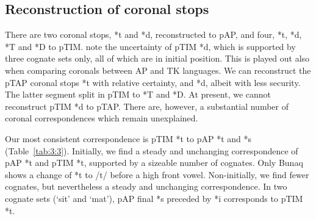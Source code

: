 \subsection{Reconstruction of coronal stops}
There are two coronal stops, *t and *d, reconstructed to pAP, and four, *t, *d, *T and *D to pTIM. \citet{SchapperEtAl2012} note the uncertainty of pTIM *d, which is supported by three cognate sets only, all of which are in initial position. This is played out also when comparing coronals between AP and TK languages. We can reconstruct the pTAP coronal stops *t with relative certainty, and *d, albeit with less security. The latter segment split in pTIM to *T and *D. At present, we cannot reconstruct pTIM *d to pTAP. There are, however, a substantial number of coronal correspondences which remain unexplained. 

Our most consistent correspondence is pTIM *t to pAP *t and *s (Table~\ref{tab:3:3}). Initially, we find a steady and unchanging correspondence of pAP *t and pTIM *t, supported by a sizeable number of cognates. Only Bunaq shows a change of *t to /t{\textesh}/ before a high front vowel. Non-initially, we find fewer cognates, but nevertheless a steady and unchanging correspondence. In two cognate sets (`sit' and `mat'), pAP final *s preceded by *i corresponds to pTIM *t.
 

